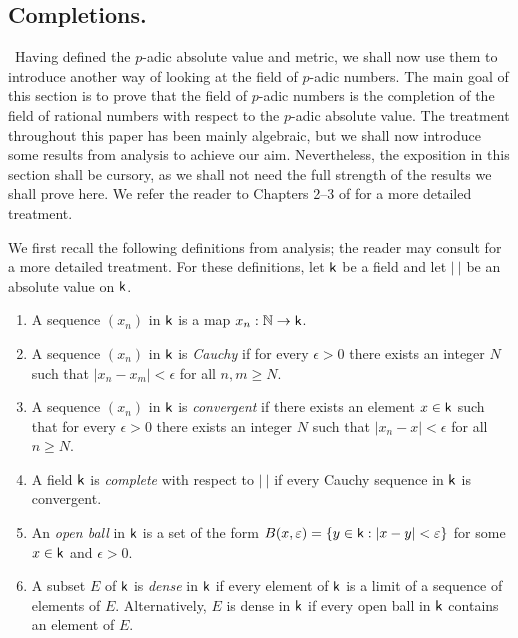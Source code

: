 \subsection{Completions.}~Having defined the \(p\)-adic absolute value and
metric, we shall now use them to introduce another way of looking at the field
of \(p\)-adic numbers. The main goal of this section is to prove that the field
of \(p\)-adic numbers is the completion of the field of rational numbers with
respect to the \(p\)-adic absolute value. The treatment throughout this paper
has been mainly algebraic, but we shall now introduce some results from analysis
to achieve our aim. Nevertheless, the exposition in this section shall be
cursory, as we shall not need the full strength of the results we shall prove
here. We refer the reader to Chapters 2--3 of \cite{gouvea1997p} for a more
detailed treatment.

We first recall the following definitions from analysis; the reader may consult
\cite{rudin1976principles} for a more detailed treatment. For these definitions,
let \(\mathsf{k}\) be a field and let \(|\ |\) be an absolute value on \(\mathsf{k}\). 

\begin{enumerate}[nosep, label=(\roman*)]
    \item A sequence \((x_n)\) in \(\mathsf{k}\) is a map \(x_n : \mathbb{N} \to
    \mathsf{k}\).
    \item A sequence \((x_n)\) in \(\mathsf{k}\) is \emph{Cauchy} if for every
    \(\epsilon > 0\) there exists an integer \(N\) such that \(|x_n - x_m| <
    \epsilon\) for all \(n, m \geq N\).
    \item A sequence \((x_n)\) in \(\mathsf{k}\) is \emph{convergent} if there
    exists an element \(x \in \mathsf{k}\) such that for every \(\epsilon > 0\)
    there exists an integer \(N\) such that \(|x_n - x| < \epsilon\) for all \(n
    \geq N\).
    \item A field \(\mathsf{k}\) is \emph{complete} with respect to \(|\ |\) if
    every Cauchy sequence in \(\mathsf{k}\) is convergent.
    \item An \emph{open ball} in \(\mathsf{k}\) is a set of the form \(B(x,\varepsilon)
    = \{y \in \mathsf{k} : |x - y| < \varepsilon\}\) for some \(x \in \mathsf{k}\) and
    \(\epsilon > 0\).
    \item A subset \(E\) of \(\mathsf{k}\) is \emph{dense} in \(\mathsf{k}\) if every
    element of \(\mathsf{k}\) is a limit of a sequence of elements of \(E\).
    Alternatively, \(E\) is dense in \(\mathsf{k}\) if every open ball in \(\mathsf{k}\)
    contains an element of \(E\).
\end{enumerate}

